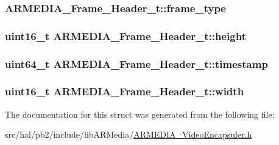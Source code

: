 \subsubsection[{\texorpdfstring{frame\+\_\+type}{frame_type}}]{ A\+R\+M\+E\+D\+I\+A\+\_\+\+Frame\+\_\+\+Header\+\_\+t\+::frame\+\_\+type}\hypertarget{struct_a_r_m_e_d_i_a___frame___header__t_a5f2fd4cbbc86cdfb657964b6ebb64226}{}\label{struct_a_r_m_e_d_i_a___frame___header__t_a5f2fd4cbbc86cdfb657964b6ebb64226}
\subsubsection[{\texorpdfstring{height}{height}}]{\setlength{\rightskip}{0pt plus 5cm}uint16\+\_\+t A\+R\+M\+E\+D\+I\+A\+\_\+\+Frame\+\_\+\+Header\+\_\+t\+::height}\hypertarget{struct_a_r_m_e_d_i_a___frame___header__t_a2c931e1f7ef301344623a7fa25259ab5}{}\label{struct_a_r_m_e_d_i_a___frame___header__t_a2c931e1f7ef301344623a7fa25259ab5}
\subsubsection[{\texorpdfstring{timestamp}{timestamp}}]{\setlength{\rightskip}{0pt plus 5cm}uint64\+\_\+t A\+R\+M\+E\+D\+I\+A\+\_\+\+Frame\+\_\+\+Header\+\_\+t\+::timestamp}\hypertarget{struct_a_r_m_e_d_i_a___frame___header__t_a97bcb9c81ee1d508329b2e3e6ef3bd5b}{}\label{struct_a_r_m_e_d_i_a___frame___header__t_a97bcb9c81ee1d508329b2e3e6ef3bd5b}
\subsubsection[{\texorpdfstring{width}{width}}]{\setlength{\rightskip}{0pt plus 5cm}uint16\+\_\+t A\+R\+M\+E\+D\+I\+A\+\_\+\+Frame\+\_\+\+Header\+\_\+t\+::width}\hypertarget{struct_a_r_m_e_d_i_a___frame___header__t_a85e958b21feca7b4ca2d3c72a6ea0311}{}\label{struct_a_r_m_e_d_i_a___frame___header__t_a85e958b21feca7b4ca2d3c72a6ea0311}


The documentation for this struct was generated from the following file\+:\begin{DoxyCompactItemize}
\item 
src/hal/pb2/include/lib\+A\+R\+Media/\hyperlink{_a_r_m_e_d_i_a___video_encapsuler_8h}{A\+R\+M\+E\+D\+I\+A\+\_\+\+Video\+Encapsuler.\+h}\end{DoxyCompactItemize}
